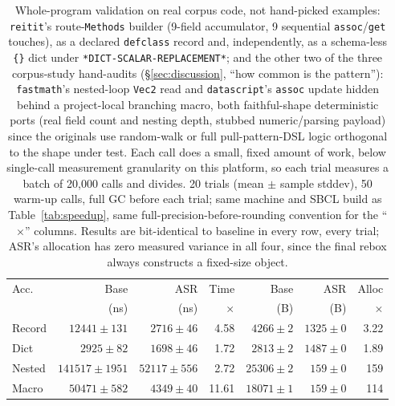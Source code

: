 \documentclass[sigplan,screen,review,anonymous]{acmart}
\begin{document}
\begin{table}
  \caption{Whole-program validation on real corpus code, not hand-picked
  examples: \texttt{reitit}'s route-\texttt{Methods} builder (9-field
  accumulator, 9 sequential \texttt{assoc}/\texttt{get} touches), as a
  declared \texttt{defclass} record and, independently, as a schema-less
  \texttt{\{\}} dict under \texttt{*DICT-SCALAR-REPLACEMENT*}; and the
  other two of the three corpus-study hand-audits (\S\ref{sec:discussion},
  ``how common is the pattern''): \texttt{fastmath}'s nested-loop
  \texttt{Vec2} read and \texttt{datascript}'s \texttt{assoc} update
  hidden behind a project-local branching macro, both faithful-shape
  deterministic ports (real field count and nesting depth, stubbed
  numeric/parsing payload) since the originals use random-walk or
  full pull-pattern-DSL logic orthogonal to the shape under test. Each
  call does a small, fixed amount of work, below single-call measurement
  granularity on this platform, so each trial measures a batch of
  20{,}000 calls and divides. 20 trials (mean $\pm$ sample stddev), 50 warm-up calls,
  full GC before each trial; same machine and SBCL build as
  Table~\ref{tab:speedup}, same full-precision-before-rounding
  convention for the ``$\times$'' columns. Results are bit-identical to
  baseline in every row, every trial; ASR's allocation has zero
  measured variance in all four, since the final rebox always
  constructs a fixed-size object.}
  \label{tab:reitit}
  \footnotesize
  \setlength{\tabcolsep}{2.5pt}
  \begin{tabular}{lrrrrrr}
    \toprule
    Acc.\  & Base & ASR & Time & Base & ASR & Alloc \\
           & (ns) & (ns) & $\times$ & (B) & (B) & $\times$ \\
    \midrule
    Record & $12441\pm131$ & $2716\pm46$ & 4.58 & $4266\pm2$ & $1325\pm0$ & 3.22 \\
    Dict   & $2925\pm82$\phantom{00} & $1698\pm46$ & 1.72 & $2813\pm2$ & $1487\pm0$ & 1.89 \\
    Nested & $141517\pm1951$ & $52117\pm556$ & 2.72 & $25306\pm2$ & $159\pm0$\phantom{00} & 159 \\
    Macro  & $50471\pm582$\phantom{0} & $4349\pm40$\phantom{0} & 11.61 & $18071\pm1$ & $159\pm0$\phantom{00} & 114 \\
    \bottomrule
  \end{tabular}
\end{table}
\end{document}
